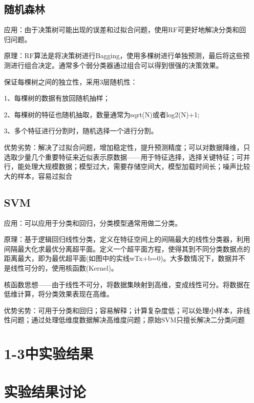 \documentclass{HEBUTMaster}   %
\begin{document}
\section{随机森林}
应用：由于决策树可能出现的误差和过拟合问题，使用RF可更好地解决分类和回归问题。

原理：RF算法是将决策树进行Bagging，使用多棵树进行单独预测，最后将这些预测进行组合决定。通常多个弱分类器通过组合可以得到很强的决策效果。

保证每棵树之间的独立性，采用3层随机性：

1、每棵树的数据有放回随机抽样；

2、每棵树的特征也随机抽取，数量通常为sqrt(N)或者log2(N)+1;

3、多个特征进行分割时，随机选择一个进行分割。

优势劣势：解决了过拟合问题，增加稳定性，提升预测精度；可以对数据降维，只选取少量几个重要特征来近似表示原数据——用于特征选择，选择关键特征；可并行，能处理大规模数据；模型过大，需要存储空间大，模型加载时间长；噪声比较大的样本，容易过拟合

\section{SVM}
应用：可以应用于分类和回归，分类模型通常用做二分类。

原理：基于逻辑回归线性分类，定义在特征空间上的间隔最大的线性分类器，利用间隔最大化求最优分离超平面。定义一个超平面方程，使得其到不同分类数据点的距离最大，即为最优超平面(如图中的实线wTx+b=0)。大多数情况下，数据并不是线性可分的，使用核函数(Kernel)。

核函数思想——由于线性不可分，将数据集映射到高维，变成线性可分。将数据在低维计算，将分类效果表现在高维。

优势劣势：可用于分类和回归；容易解释；计算复杂度低；可以处理小样本，非线性问题；通过处理低维度数据解决高维度问题；原始SVM只擅长解决二分类问题

\chapter{1-3中实验结果}

\chapter{实验结果讨论}
\end{document}
